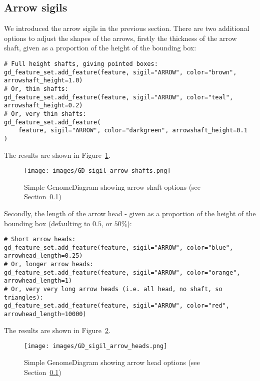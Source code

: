 \subsection{Arrow sigils}
\label{sec:gd_arrow_sigils}

We introduced the arrow sigils in the previous section.
There are two additional options to adjust the shapes of the arrows, firstly
the thickness of the arrow shaft, given as a proportion of the height of the
bounding box:

\begin{verbatim}
# Full height shafts, giving pointed boxes:
gd_feature_set.add_feature(feature, sigil="ARROW", color="brown", arrowshaft_height=1.0)
# Or, thin shafts:
gd_feature_set.add_feature(feature, sigil="ARROW", color="teal", arrowshaft_height=0.2)
# Or, very thin shafts:
gd_feature_set.add_feature(
    feature, sigil="ARROW", color="darkgreen", arrowshaft_height=0.1
)
\end{verbatim}

\noindent The results are shown in Figure~\ref{fig:gd_sigil_arrow_shafts}.
\begin{figure}[htbp]
\centering
\texttt{[image: images/GD\_sigil\_arrow\_shafts.png]}
\caption{Simple GenomeDiagram showing arrow shaft options
(see Section~\ref{sec:gd_arrow_sigils})}
\label{fig:gd_sigil_arrow_shafts}
\end{figure}

Secondly, the length of the arrow head - given as a proportion of the height
of the bounding box (defaulting to $0.5$, or $50\%$):

\begin{verbatim}
# Short arrow heads:
gd_feature_set.add_feature(feature, sigil="ARROW", color="blue", arrowhead_length=0.25)
# Or, longer arrow heads:
gd_feature_set.add_feature(feature, sigil="ARROW", color="orange", arrowhead_length=1)
# Or, very very long arrow heads (i.e. all head, no shaft, so triangles):
gd_feature_set.add_feature(feature, sigil="ARROW", color="red", arrowhead_length=10000)
\end{verbatim}

\noindent The results are shown in Figure~\ref{fig:gd_sigil_arrow_heads}.
\begin{figure}[htbp]
\centering
\texttt{[image: images/GD\_sigil\_arrow\_heads.png]}
\caption{Simple GenomeDiagram showing arrow head options
(see Section~\ref{sec:gd_arrow_sigils})}
\label{fig:gd_sigil_arrow_heads}
\end{figure}

